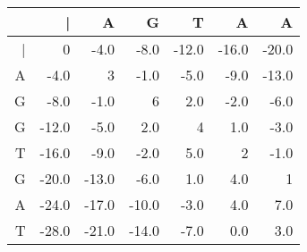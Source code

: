 \begin{tabular}{|r|r|r|r|r|r|r|}
\hline
 & | & A & G & T & A & A\\
\hline
| & 0 & -4.0 & -8.0 & -12.0 & -16.0 & -20.0\\
\hline
A & -4.0 & 3 & -1.0 & -5.0 & -9.0 & -13.0\\
\hline
G & -8.0 & -1.0 & 6 & 2.0 & -2.0 & -6.0\\
\hline
G & -12.0 & -5.0 & 2.0 & 4 & 1.0 & -3.0\\
\hline
T & -16.0 & -9.0 & -2.0 & 5.0 & 2 & -1.0\\
\hline
G & -20.0 & -13.0 & -6.0 & 1.0 & 4.0 & 1\\
\hline
A & -24.0 & -17.0 & -10.0 & -3.0 & 4.0 & 7.0\\
\hline
T & -28.0 & -21.0 & -14.0 & -7.0 & 0.0 & 3.0\\
\hline
\end{tabular}
